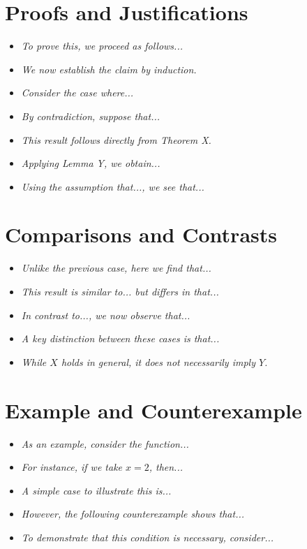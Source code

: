 \documentclass[10pt,letterpaper,oneside,reqno]{amsart}
\begin{document}
\begin{multicols}{2}
        \section*{Proofs and Justifications}
        \begin{itemize}
            \item \textit{To prove this, we proceed as follows...}
            \item \textit{We now establish the claim by induction.}
            \item \textit{Consider the case where...}
            \item \textit{By contradiction, suppose that...}
            \item \textit{This result follows directly from Theorem X.}
            \item \textit{Applying Lemma Y, we obtain...}
            \item \textit{Using the assumption that..., we see that...}
        \end{itemize}

        \columnbreak

        \section*{Comparisons and Contrasts}
        \begin{itemize}
            \item \textit{Unlike the previous case, here we find that...}
            \item \textit{This result is similar to... but differs in that...}
            \item \textit{In contrast to..., we now observe that...}
            \item \textit{A key distinction between these cases is that...}
            \item \textit{While \( X \) holds in general, it does not necessarily imply \( Y \).}
        \end{itemize}

        \section*{Example and Counterexample}
        \begin{itemize}
            \item \textit{As an example, consider the function...}
            \item \textit{For instance, if we take \( x = 2 \), then...}
            \item \textit{A simple case to illustrate this is...}
            \item \textit{However, the following counterexample shows that...}
            \item \textit{To demonstrate that this condition is necessary, consider...}
        \end{itemize}


\end{multicols}
\end{document}
